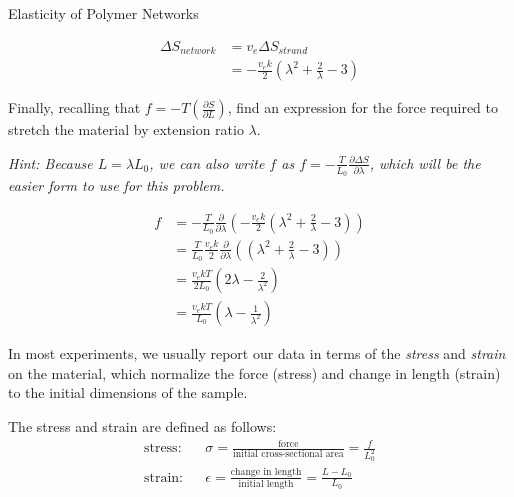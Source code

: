 \begin{activity}{Elasticity of Polymer Networks}
\begin{ctqs}
			\begin{solution}[1.5in]
				\begin{align*}
					\Delta S_{network} &= v_e \Delta S_{strand}\\
						&= -\frac{v_e k}{2}\left(\lambda^2 + \frac{2}{\lambda} - 3\right)
				\end{align*}
			\end{solution}
		
	\question Finally, recalling that $f = -T\left(\frac{\partial S}{\partial L}\right)$, find an expression for the force required to stretch the material by extension ratio $\lambda$.
	
		\emph{Hint: Because $L = \lambda L_0$, we can also write $f$ as $f = -\frac{T}{L_0}\frac{\partial \Delta S}{\partial \lambda}$, which will be the easier form to use for this problem.}
		
			\begin{solution}[3in]
			
				\begin{align*}
					f &= -\frac{T}{L_0}\frac{\partial}{\partial \lambda} \left(-\frac{v_e k}{2}\left(\lambda^2 + \frac{2}{\lambda} - 3\right)\right)\\
						&= \frac{T}{L_0}\frac{v_e k}{2}\frac{\partial}{\partial \lambda} \left(\left(\lambda^2 + \frac{2}{\lambda} - 3\right)\right)\\
						&= \frac{v_e k T}{2 L_0}\left(2\lambda - \frac{2}{\lambda^2} \right)\\
						&= \frac{v_e k T}{L_0}\left(\lambda - \frac{1}{\lambda^2} \right)
				\end{align*}
			\end{solution}
	
\end{ctqs}

\begin{model}

	In most experiments, we usually report our data in terms of the \emph{stress} and \emph{strain} on the material, which normalize the force (stress) and change in length (strain) to the initial dimensions of the sample.
	
	The stress and strain are defined as follows:
	\begin{align*}
		\text{stress:} && \sigma = \frac{\text{force}}{\text{initial cross-sectional area}} = \frac{f}{L_0^2} \\
		\text{strain:} && \epsilon = \frac{\text{change in length}}{\text{initial length}} = \frac{L-L_0}{L_0}
	\end{align*}
	

\end{model}
\end{activity}
